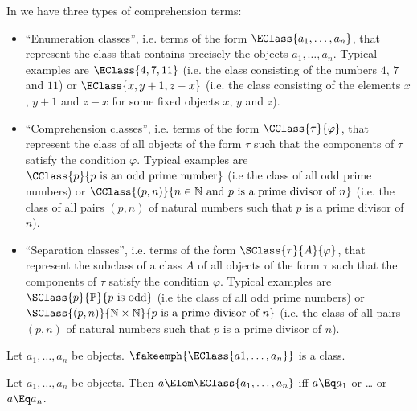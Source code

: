 \documentclass{stex}
\begin{document}
In \ForTheL we have three types of comprehension terms:
\begin{itemize}
  \item ``Enumeration classes'', i.e. terms of the form
  $\EClass{a_1,\dots,a_n}$, that represent the class that contains precisely the
  objects $a_1,\dots,a_n$.
  Typical examples are $\EClass{4,7,11}$ (i.e. the class consisting of the
  numbers $4$, $7$ and $11$) or $\EClass{x,y+1,z-x}$ (i.e. the class consisting
  of the elements $x$, $y+1$ and $z-x$ for some fixed objects $x$, $y$ and $z$).
  \item ``Comprehension classes'', i.e. terms of the form
  $\CClass{\tau}{\varphi}$, that represent the class of all objects of the form
  $\tau$ such that the components of $\tau$ satisfy the condition $\varphi$.
  Typical examples are $\CClass{p}{p \text{ is an odd prime number}}$ (i.e the
  class of all odd prime numbers) or $\CClass{(p,n)}{n \in \mathbb{N}
  \text{ and } p \text{ is a prime divisor of } n}$ (i.e. the class of all pairs
  $(p,n)$ of natural numbers such that $p$ is a prime divisor of $n$).
  \item ``Separation classes'', i.e. terms of the form
  $\SClass{\tau}{A}{\varphi}$, that represent the subclass of a class $A$ of all
  objects of the form $\tau$ such that the components of $\tau$ satisfy the
  condition $\varphi$.
  Typical examples are $\SClass{p}{\mathbb{P}}{p \text{ is odd}}$ (i.e the
  class of all odd prime numbers) or $\SClass{(p,n)}{\mathbb{N}\times\mathbb{N}}
  {p \text{ is a prime divisor of } n}$ (i.e. the class of all pairs
  $(p,n)$ of natural numbers such that $p$ is a prime divisor of $n$).
\end{itemize}

\begin{sparagraph}[style=symdoc,for=EClass]
  \begin{signature*}
    Let $a_1, \dots, a_n$ be objects.
    $\fakeemph{\EClass{a1, \dots, a_n}}$ is a class.
  \end{signature*}

  \begin{axiom*}
    Let $a_1, \dots, a_n$ be objects.
    Then $a \Elem \EClass{a_1, \dots, a_n}$ iff $a \Eq a_1$ or \dots{} or $a \Eq a_n$.
  \end{axiom*}
\end{sparagraph}
\end{document}

